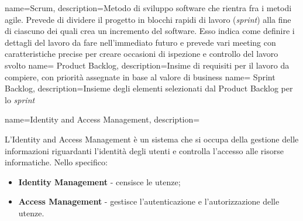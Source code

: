{
	name=Scrum,
	description={Metodo di sviluppo software che rientra fra i metodi agile. Prevede di dividere il progetto in blocchi rapidi di lavoro (\textit{sprint}) alla fine di ciascuno dei quali crea un incremento del software. Esso indica come definire i dettagli del lavoro da fare nell'immediato futuro e prevede vari meeting con caratteristiche precise per creare occasioni di ispezione e controllo del lavoro svolto \cite{scrum}
	}
}
{
	name= Product Backlog,
	description={Insime di requisiti per il lavoro da compiere, con priorità assegnate in base al valore di business}
}
{
	name= Sprint Backlog,
	description={Insieme degli elementi selezionati dal Product Backlog per lo \textit{sprint}}
}
{
	name=Identity and Access Management,
	description={L'Identity and Access Management è un sistema che si occupa della gestione delle informazioni riguardanti l'identità degli utenti e controlla l'accesso alle risorse informatiche. Nello specifico:
	\begin{itemize}
		\item \textbf{Identity Management} - censisce le utenze;
		\item \textbf{Access Management} - gestisce l'autenticazione e l'autorizzazione delle utenze. 
	\end{itemize}}
}

